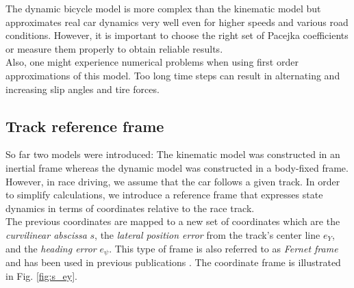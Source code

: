 The dynamic bicycle model is more complex than the kinematic model but approximates real car dynamics very well even for higher speeds and various road conditions. However, it is important to choose the right set of Pacejka coefficients or measure them properly to obtain reliable results.\\
Also, one might experience numerical problems when using first order approximations of this model. Too long time steps can result in alternating and increasing slip angles and tire forces.

\subsection{Track reference frame}
So far two models were introduced: The kinematic model was constructed in an inertial frame whereas the dynamic model was constructed in a body-fixed frame. However, in race driving, we assume that the car follows a given track. In order to simplify calculations, we introduce a reference frame that expresses state dynamics in terms of coordinates relative to the race track.\\
The previous coordinates are mapped to a new set of coordinates which are the \emph{curvilinear abscissa} $s$, the \emph{lateral position error} from the track's center line $e_Y$, and the \emph{heading error} $e_\psi$. This type of frame is also referred to as \emph{Fernet frame} and has been used in previous publications \cite{Micaelli2006}. The coordinate frame is illustrated in Fig. \ref{fig:s_ey}.

